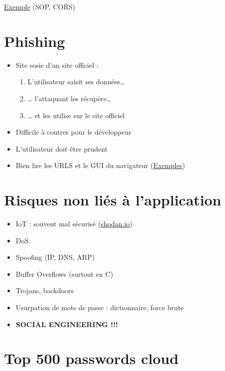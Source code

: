 \href{https://www.owasp.org/index.php/CSRF}{Exemple} (SOP, CORS)

\hypertarget{phishing}{%
\section{Phishing}\label{phishing}}

\begin{itemize}
\tightlist
\item
  Site sosie d'un site officiel :

  \begin{enumerate}
  \def\labelenumi{\arabic{enumi}.}
  \tightlist
  \item
    L'utilisateur saisit ses données\ldots{}
  \item
    \ldots{} l'attaquant les récupère\ldots{}
  \item
    \ldots{} et les utilise sur le site officiel
  \end{enumerate}
\item
  Difficile à contrer pour le développeur
\item
  L'utilisateur doit être prudent
\item
  Bien lire les URLS et le GUI du navigateur
  (\href{http://kb.cadzow.com.au:15384/cadzow/details.aspx?ID=1422}{Exemples})
\end{itemize}

\hypertarget{risques-non-liuxe9s-uxe0-lapplication}{%
\section{Risques non liés à
l'application}\label{risques-non-liuxe9s-uxe0-lapplication}}

\begin{itemize}
\tightlist
\item
  IoT : souvent mal sécurisé (\href{https://www.shodan.io/}{shodan.io})
\item
  DoS
\item
  Spoofing (IP, DNS, ARP)
\item
  Buffer Overflows (surtout en C)
\item
  Trojans, backdoors
\item
  Usurpation de mots de passe : dictionnaire, force brute
\item
  \textbf{SOCIAL ENGINEERING !!!}
\end{itemize}

\hypertarget{top-500-passwords-cloud}{%
\section{Top 500 passwords cloud}\label{top-500-passwords-cloud}}

